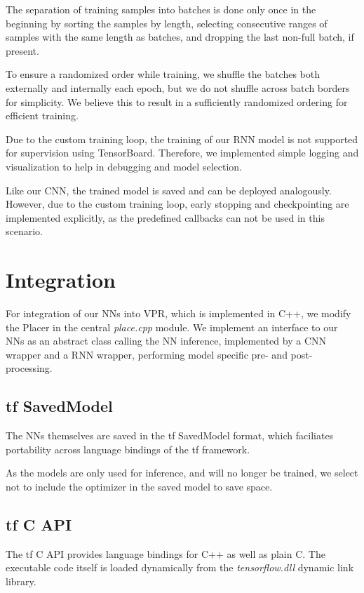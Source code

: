 The separation of training samples into batches is done only once in the beginning by sorting the samples by length, selecting consecutive ranges of samples with the same length as batches, and dropping the last non-full batch, if present.

To ensure a randomized order while training, we shuffle the batches both externally and internally each epoch, but we do not shuffle across batch borders for simplicity. We believe this to result in a sufficiently randomized ordering for efficient training.

Due to the custom training loop, the training of our \gls{RNN} model is not supported for supervision using TensorBoard. Therefore, we implemented simple logging and visualization to help in debugging and model selection.

Like our \gls{CNN}, the trained model is saved and can be deployed analogously. However, due to the custom training loop, early stopping and checkpointing are implemented explicitly, as the predefined callbacks can not be used in this scenario.

\section{Integration}

For integration of our \glspl{NN} into \gls{VPR}, which is implemented in C++, we modify the Placer in the central \textit{place.cpp} module. We implement an interface to our \glspl{NN} as an abstract class calling the \gls{NN} inference, implemented by a \gls{CNN} wrapper and a \gls{RNN} wrapper, performing model specific pre- and post-processing.

\subsection{\gls{tf} SavedModel}

The \glspl{NN} themselves are saved in the \gls{tf} SavedModel format, which faciliates portability across language bindings of the \gls{tf} framework. 
	
As the models are only used for inference, and will no longer be trained, we select not to include the optimizer in the saved model to save space.

\subsection{\gls{tf} C API}

The \gls{tf} C API provides language bindings for C++ as well as plain C. The executable code itself is loaded dynamically from the \textit{tensorflow.dll} dynamic link library.

